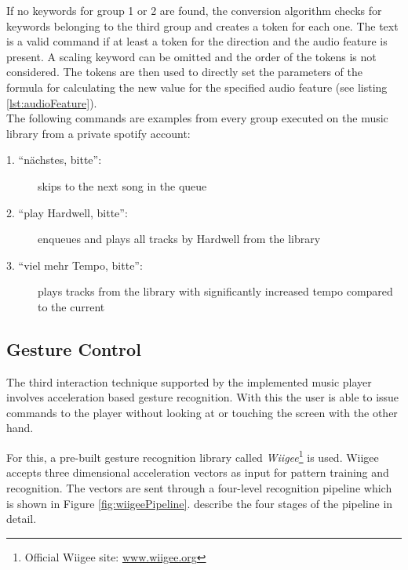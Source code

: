 If no keywords for group 1 or 2 are found, the conversion algorithm checks for keywords belonging to the third group and creates a token for each one. The text is a valid command if at least a token for the direction and the audio feature is present. A scaling keyword can be omitted and the order of the tokens is not considered. The tokens are then used to directly set the parameters of the formula for calculating the new value for the specified audio feature (see listing \ref{lst:audioFeature}).\\

The following commands are examples from every group executed on the music library from a private spotify account:
\begin{description}
	\item[1. ``n\"achstes, bitte'':] skips to the next song in the queue
	\item[2. ``play Hardwell, bitte'':] enqueues and plays all tracks by Hardwell from the library
	\item[3. ``viel mehr Tempo, bitte'':] plays tracks from the library with significantly increased tempo compared to the current
\end{description}


\subsection{Gesture Control}
The third interaction technique supported by the implemented music player involves acceleration based gesture recognition. With this the user is able to issue commands to the player without looking at or touching the screen with the other hand.

For this, a pre-built gesture recognition library called \textit{Wiigee}\footnote{Official Wiigee site: \url{www.wiigee.org}} is used. Wiigee accepts three dimensional acceleration vectors as input for pattern training and recognition. The vectors are sent through a four-level recognition pipeline which is shown in Figure \ref{fig:wiigeePipeline}. \cite{Schlomer:2008:GRW:1347390.1347395} describe the four stages of the pipeline in detail.

